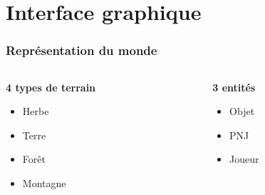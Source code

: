 \documentclass{beamer}
\begin{document}
\author{RIVOIRE Claire}



\section{Interface graphique}

\begin{frame}

   \frametitle{Représentation du monde}
 \begin{columns}[t]
  \begin{column}{5cm}
\textbf{4 types de terrain} \\
\vspace{5mm} 
\begin{itemize}
 \item  Herbe  ~\\
\vspace{5mm} 
 \item   Terre ~ \\
\vspace{5mm} 
 \item  Forêt ~ \\
\vspace{5mm} 
 \item  Montagne 
\end{itemize}
  \end{column}
  
  \begin{column}{5cm}
\textbf{3 entités}
\vspace{5mm} 
\begin{itemize}
 \item  Objet ~ \\
\vspace{5mm} 
 \item  PNJ ~ \\
\vspace{5mm} 
 \item Joueur 
\end{itemize}

  \end{column}
 \end{columns}



\end{frame}
\end{document}
